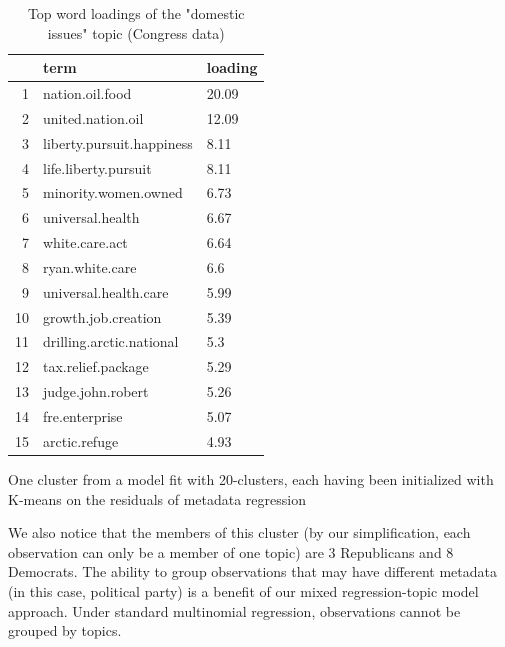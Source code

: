 \documentclass[12pt]{article}
\begin{document}




\begin{table}[ht]
\centering
\begin{threeparttable}
\caption{Top word loadings of the "domestic issues" topic (Congress data)}
\begin{tabular}{rll}
  \hline
 & term & loading \\ 
  \hline
1 & nation.oil.food & 20.09 \\ 
  2 & united.nation.oil & 12.09 \\ 
  3 & liberty.pursuit.happiness & 8.11 \\ 
  4 & life.liberty.pursuit & 8.11 \\ 
  5 & minority.women.owned & 6.73 \\ 
  6 & universal.health & 6.67 \\ 
  7 & white.care.act & 6.64 \\ 
  8 & ryan.white.care & 6.6 \\ 
  9 & universal.health.care & 5.99 \\ 
  10 & growth.job.creation & 5.39 \\ 
  11 & drilling.arctic.national & 5.3 \\ 
  12 & tax.relief.package & 5.29 \\ 
  13 & judge.john.robert & 5.26 \\ 
  14 & fre.enterprise & 5.07 \\ 
  15 & arctic.refuge & 4.93 \\ 
   \hline
\end{tabular}
\begin{tablenotes}
\small
\item One cluster from a model fit with 20-clusters, each having been initialized with K-means on the residuals of metadata regression
\end{tablenotes}
\end{threeparttable}
\end{table}


We also notice that the members of this cluster (by our simplification, each observation can only be a member of one topic) are 3 Republicans and 8 Democrats. 
The ability to group observations that may have different metadata (in this case, political party) is a benefit of our mixed regression-topic model approach. 
Under standard multinomial regression, observations cannot be grouped by topics.
\end{document}
